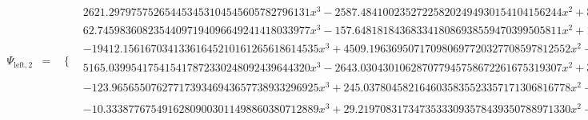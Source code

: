 \documentclass{article}
\begin{document}
\begin{landscape}
\begin{eqnarray*}
\begin{array}{cc}
\end{array}\\
\Psi_{\text{left},2} & = & \begin{array}{cc}
 \{ & 
\begin{array}{cc}
 2621.297975752654453453104545605782796131 x^3-2587.484100235272258202494930154104156244 x^2+846.2287708786083114592944855748232925348 x-91.76916260425833515512136673947102700886 & x\geq \frac{1}{4}\land x<\frac{3}{8} \\
 62.74598360823544097194096649241418033977 x^3-157.6481818436833418086938559470399505811 x^2+103.2409537708433950544345648579775230742 x-19.92076700192283650986581191371571928418 & x\geq \frac{3}{8}\land x<\frac{1}{2} \\
 -19412.15616703413361645210161265618614535 x^3+4509.196369507170980697720327708597812552 x^2-238.9503168618188631745904691076157340431 x & x\geq 0\land x<\frac{1}{8} \\
 5165.039954175415417872330248092439644320 x^3-2643.030430106287077945758672261675319307 x^2+397.0503148598480405023215374123607150308 x-15.74887139548548125097454741848619819439 & x\geq \frac{1}{8}\land x<\frac{1}{4} \\
 -123.9656550762771739346943657738933296925 x^3+245.0378045821646035835523357171306816778 x^2-159.4113036416200891578351276064624766605 x+34.07281993341099611153690293575006127247 & \left(x\geq \frac{1}{2}\land x<\frac{5}{8}\right)\lor \left(x\geq \frac{5}{8}\land x<\frac{3}{4}\right) \\
 -10.33387767549162809003011498860380712889 x^3+29.21970831734735333093578439350788971330 x^2-27.43778360821982239178122382120435803993 x+8.551952966364097150875554416300275455520 & \left(x\geq \frac{3}{4}\land x<\frac{7}{8}\right)\lor \left(x\geq \frac{7}{8}\land x<1\right)
\end{array}


\end{array}
\end{eqnarray*}
\end{landscape}
\end{document}
